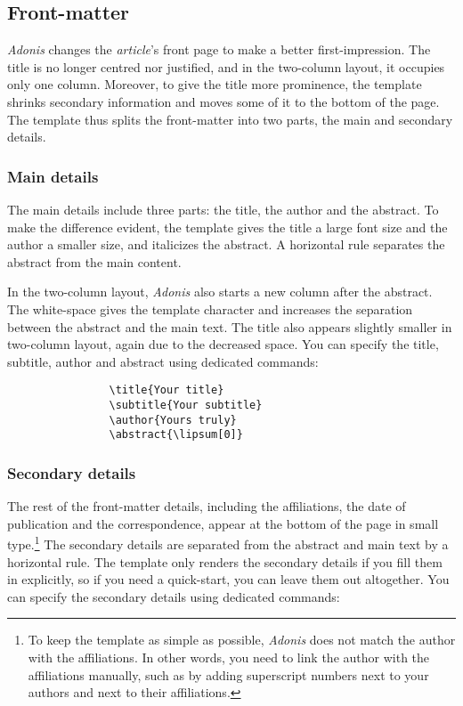 \documentclass{adonis}
\begin{document}
		\subsection{Front-matter}
		
			\textit{Adonis} changes the \textit{article}'s front page to make a better first-impression.
			The title is no longer centred nor justified, and in the two-column layout, it occupies only one column.
			Moreover, to give the title more prominence, the template shrinks secondary information and moves some of it to the bottom of the page.
			The template thus splits the front-matter into two parts, the main and secondary details.
			
			\subsubsection{Main details}
			
			The main details include three parts: the title, the author and the abstract.
			To make the difference evident, the template gives the title a large font size and the author a smaller size, and italicizes the abstract.
			A horizontal rule separates the abstract from the main content.
			
			In the two-column layout, \textit{Adonis} also starts a new column after the abstract.
			The white-space gives the template character and increases the separation between the abstract and the main text.
			The title also appears slightly smaller in two-column layout, again due to the decreased space.
			You can specify the title, subtitle, author and abstract using dedicated commands:
			
			\begin{verbatim}
				\title{Your title}
				\subtitle{Your subtitle}
				\author{Yours truly}
				\abstract{\lipsum[0]}
			\end{verbatim}
			
			\subsubsection{Secondary details}
			
			The rest of the front-matter details, including the affiliations, the date of publication and the correspondence, appear at the bottom of the page in small type.\footnote{
				To keep the template as simple as possible, \textit{Adonis} does not match the author with the affiliations.
				In other words, you need to link the author with the affiliations manually, such as by adding superscript numbers next to your authors and next to their affiliations.
			}
			The secondary details are separated from the abstract and main text by a horizontal rule.
			The template only renders the secondary details if you fill them in explicitly, so if you need a quick-start, you can leave them out altogether.
			You can specify the secondary details using dedicated commands:
			
\end{document}
